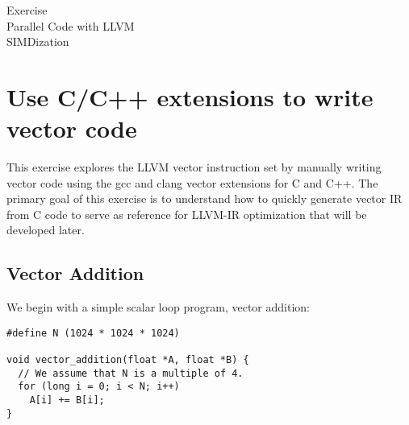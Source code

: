 \documentclass[12pt]{article}
\begin{document}
{
\centering
\Huge{
Exercise\\
Parallel Code with LLVM\\
SIMDization\\
}}

\section {Use C/C++ extensions to write vector code}

This exercise explores the LLVM vector instruction set by manually writing
vector code using the gcc and clang vector extensions for C and C++. The
primary goal of this exercise is to understand how to quickly generate vector
IR from C code to serve as reference for LLVM-IR optimization that will be
developed later.

\subsection{Vector Addition}
We begin with a simple scalar loop program, vector addition:

\begin{verbatim}
#define N (1024 * 1024 * 1024)

void vector_addition(float *A, float *B) {
  // We assume that N is a multiple of 4.
  for (long i = 0; i < N; i++)
    A[i] += B[i];
}
\end{verbatim}
\end{document}
